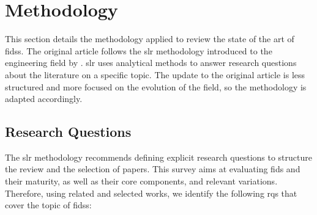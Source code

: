 \section{Methodology\label{sec:sota.methodo}}

This section details the methodology applied to review the state of the art of \glspl{fids}.
The original article follows the \gls{slr} methodology introduced to the engineering field by \textcite{kitchenham_Guidelinesperformingsystematic_2007}.
\Gls{slr} uses analytical methods to answer research questions about the literature on a specific topic.
The update to the original article is less structured and more focused on the evolution of the field, so the methodology is adapted accordingly.


\subsection{Research Questions\label{sec:sota.methodo.questions}}

The \gls{slr} methodology recommends defining explicit research questions to structure the review
and the selection of papers.
This survey aims at evaluating \gls{fids} and their maturity, as well
as their core components, and relevant variations.
Therefore, using related and selected works, we identify the following \glspl{rq} that cover the topic of \glspl{fids}:

